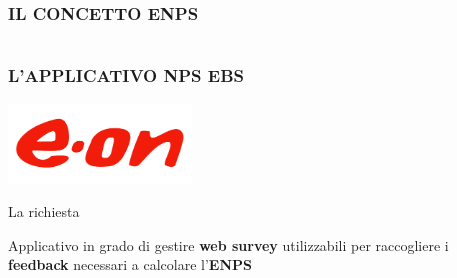 \documentclass[hyperref={pdfpagemode=FullScreen},aspectratio=169]{beamer}
\begin{document}
\section{}
\begin{frame}
\frametitle{IL CONCETTO ENPS}
\vspace{-10pt}
\begin{center}
\end{center}
\end{frame}

\section{}
\begin{frame}
\frametitle{L'APPLICATIVO NPS EBS}
\vspace{-30pt}
\begin{center}
\includegraphics[height=60pt]{images/eon} 
\end{center}

\begin{block}{\begin{center}La richiesta\end{center}}
Applicativo in grado di gestire \textbf{web survey} utilizzabili per raccogliere i \textbf{feedback} necessari a calcolare l'\textbf{ENPS}
\end{block}
\end{frame}
\end{document}
